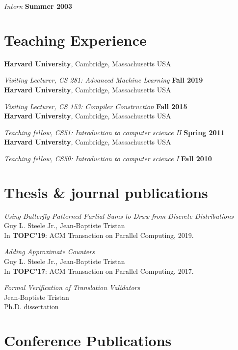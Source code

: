 \documentclass[margin,line]{res}
\begin{document}
\begin{resume}
\vspace{-.4cm}
{\em Intern} \hfill {\bf Summer 2003}\\

\section{\sc Teaching Experience}
{\bf Harvard University}, Cambridge, Massachusetts USA
\vspace{-.4cm}

{\em Visiting Lecturer, CS 281: Advanced Machine Learning} \hfill {\bf Fall 2019}\\
{\bf Harvard University}, Cambridge, Massachusetts USA
\vspace{-.4cm}

{\em Visiting Lecturer, CS 153: Compiler Construction} \hfill {\bf Fall 2015}\\
{\bf Harvard University}, Cambridge, Massachusetts USA

\vspace{-.4cm}
{\em Teaching fellow, CS51: Introduction to computer science II} \hfill {\bf Spring 2011}\\
{\bf Harvard University}, Cambridge, Massachusetts USA

\vspace{-.4cm}
{\em Teaching fellow, CS50: Introduction to computer science I} \hfill {\bf Fall 2010}\\

\section{\sc Thesis \& journal publications}

\emph{Using Butterfly-Patterned Partial Sums to Draw from Discrete Distributions}\\
Guy L. Steele Jr., Jean-Baptiste Tristan\\
In {\bf TOPC'19}: ACM Transaction on Parallel Computing, 2019.

\emph{Adding Approximate Counters}\\
Guy L. Steele Jr., Jean-Baptiste Tristan\\
In {\bf TOPC'17}: ACM Transaction on Parallel Computing, 2017.

\emph{Formal Verification of Translation Validators}\\
Jean-Baptiste Tristan\\
Ph.D. dissertation

\section{\sc Conference Publications}


\end{resume}
\end{document}
